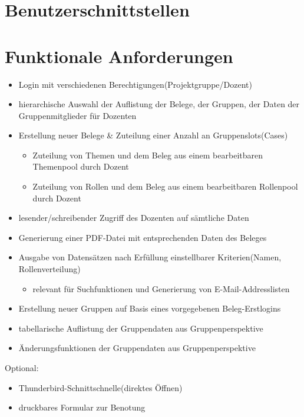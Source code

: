 \part{Benutzerschnittstellen}


\part{Funktionale Anforderungen}
\begin{itemize}
\item Login mit verschiedenen Berechtigungen(Projektgruppe/Dozent)
\item hierarchische Auswahl der Auflistung der Belege, der Gruppen, der Daten der Gruppenmitglieder für Dozenten
\item Erstellung neuer Belege & Zuteilung einer Anzahl an Gruppenslots(Cases)
\begin{itemize}
\item Zuteilung von Themen und dem Beleg aus einem bearbeitbaren Themenpool durch Dozent
\item Zuteilung von Rollen und dem Beleg aus einem bearbeitbaren Rollenpool durch Dozent
\end{itemize}
\item lesender/schreibender Zugriff des Dozenten auf sämtliche Daten
\item Generierung einer PDF-Datei mit entsprechenden Daten des Beleges
\item Ausgabe von Datensätzen nach Erfüllung einstellbarer Kriterien(Namen, Rollenverteilung)
\begin{itemize}
\item relevant für Suchfunktionen und Generierung von E-Mail-Addresslisten
\end{itemize}
\end{itemize}
\begin{itemize}
\item Erstellung neuer Gruppen auf Basis eines vorgegebenen Beleg-Erstlogins
\item tabellarische Auflistung der Gruppendaten aus Gruppenperspektive
\item Änderungsfunktionen der Gruppendaten aus Gruppenperspektive
\end{itemize}

Optional:
\begin{itemize}
\item Thunderbird-Schnittschnelle(direktes Öffnen)
\item druckbares Formular zur Benotung
\end{itemize}


